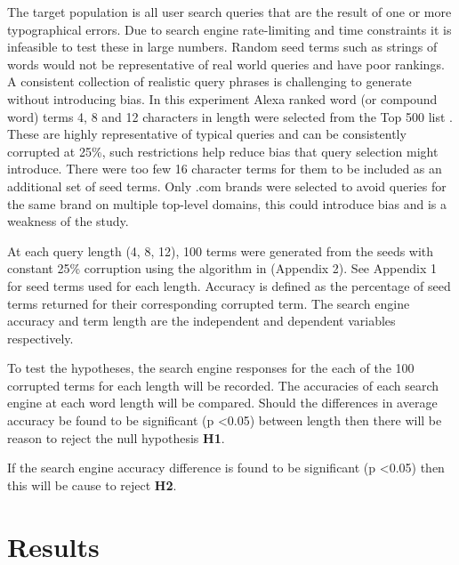 \documentclass{csfourzero}
\begin{document}
The target population is all user search queries that are the result of one or more typographical errors. Due to search engine rate-limiting and time constraints it is infeasible to test these in large numbers. Random seed terms such as strings of words would not be representative of real world queries and have poor rankings. A consistent collection of realistic query phrases is challenging to generate without introducing bias. In this experiment Alexa ranked word (or compound word) terms 4, 8 and 12 characters in length were selected from the Top 500 list \cite{alexatop500}. These are highly representative of typical queries and can be consistently corrupted at 25\%, such restrictions help reduce bias that query selection might introduce. There were too few 16 character terms for them to be included as an additional set of seed terms. Only .com brands were selected to avoid queries for the same brand on multiple top-level domains, this could introduce bias and is a weakness of the study.

At each query length (4, 8, 12), 100 terms were generated from the seeds with constant 25\% corruption using the algorithm in (Appendix 2). See Appendix 1 for seed terms used for each length. Accuracy is defined as the percentage of seed terms returned for their corresponding corrupted term. The search engine accuracy and term length are the independent and dependent variables respectively.

To test the hypotheses, the search engine responses for the each of the 100 corrupted terms for each length will be recorded. The accuracies of each search engine at each word length will be compared. Should the differences in average accuracy be found to be significant (p \textless 0.05) between length then there will be reason to reject the null hypothesis \textbf{H1}.

If the search engine accuracy difference is found to be significant (p \textless 0.05) then this will be cause to reject \textbf{H2}.

\section{Results}
\label{sec:results}
\end{document}
